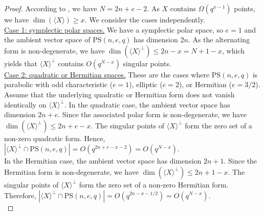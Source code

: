 \documentclass[11pt]{article}
\newcommand{\PS}{\mathrm{PS}}
\renewcommand{\leq}{\leqslant}
\renewcommand{\geq}{\geqslant}
\begin{document}
\begin{proof}
According to , we have $N=2n+e-2$.
As $X$ contains  $\Omega(q^{x-1})$ points, we have $\dim(\langle X\rangle)\geq x$.
   We consider the cases independently.\\

    \underline{Case 1: symplectic polar spaces.} We have a symplectic polar space, so $e=1$ and the ambient vector space of $\PS(n,e,q)$ has dimension $2n$. As the alternating form is non-degenerate, we have $\dim(\langle X \rangle^\perp)\leq 2n-x=N+1-x$, which yields that $\langle X \rangle^\perp$ contains $O(q^{N-x})$ singular points.  \\
    
    \underline{Case 2: quadratic or Hermitian spaces.}
    These are the cases where $\PS(n,e,q)$ is parabolic with odd characteristic ($e=1$), elliptic ($e=2$), or Hermitian ($e=3/2$).\\  
    
    Assume that the underlying quadratic or Hermitian form does not vanish identically on $\langle X \rangle^\perp$.
    In the quadratic case, the ambient vector space has dimension $2n+e$. Since the associated polar form is non-degenerate, we have $\dim(\langle X \rangle^\perp)\leq 2n+e-x$. The singular points of $\langle X \rangle^\perp$ form the zero set of a non-zero quadratic form. Hence, $|\langle X \rangle^\perp \cap\PS(n,e,q)|= O(q^{2n+e-x-2})
    =O(q^{N-x})$.\\
    In the Hermitian case, the ambient vector space has dimension $2n+1$. Since the Hermitian form is non-degenerate, we have $\dim(\langle X \rangle^\perp)\leq 2n+1-x$. The singular points of $\langle X \rangle^\perp$ form the zero set of a non-zero Hermitian form. Therefore, $|\langle X \rangle^\perp\cap\PS(n,e,q)|= O(q^{2n-x-1/2})=O(q^{N-x})$.\\
    

\end{proof}
\end{document}
